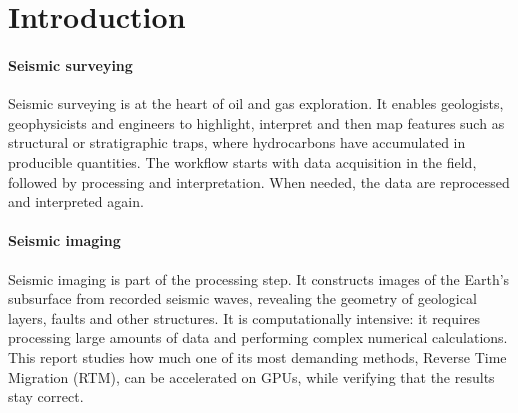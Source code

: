 \documentclass[letterpaper,11pt,leqno]{article}
\begin{document}
\section{Introduction}\label{s:introduction}

\paragraph{Seismic surveying} Seismic surveying is at the heart of oil and gas exploration. It enables geologists, geophysicists and engineers to highlight, interpret and then map features such as structural or stratigraphic traps, where hydrocarbons have accumulated in producible quantities. The workflow starts with data acquisition in the field, followed by processing and interpretation. When needed, the data are reprocessed and interpreted again.

\begin{center}
\end{center}

\paragraph{Seismic imaging} Seismic imaging is part of the processing step. It constructs images of the Earth's subsurface from recorded seismic waves, revealing the geometry of geological layers, faults and other structures. It is computationally intensive: it requires processing large amounts of data and performing complex numerical calculations. This report studies how much one of its most demanding methods, Reverse Time Migration (RTM), can be accelerated on GPUs, while verifying that the results stay correct.
\end{document}
